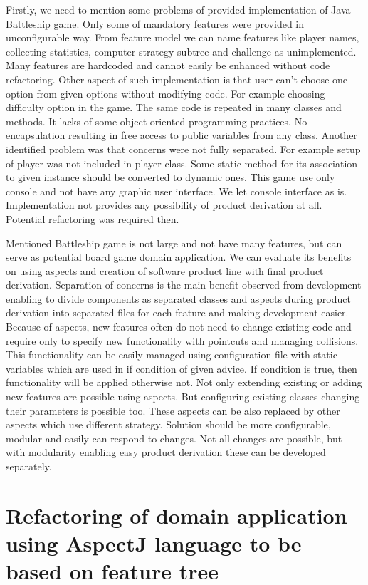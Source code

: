 \documentclass[11pt,english,a4paper,twoside]{article}
\begin{document}
Firstly, we need to mention some problems of provided implementation of Java Battleship game. Only some of mandatory features were provided in unconfigurable way. From feature model we can name features like player names, collecting statistics, computer strategy subtree and challenge as unimplemented. Many features are hardcoded and cannot easily be enhanced without code refactoring. Other aspect of such implementation is that user can't choose one option from given options without modifying code. For example choosing difficulty option in the game. The same code is repeated in many classes and methods. It lacks of some object oriented programming practices. No encapsulation resulting in free access to public variables from any class. Another identified problem was that concerns were not fully separated. For example setup of player was not included in player class. Some static method for its association to given instance should be converted to dynamic ones. This game use only console and not have any graphic user interface. We let console interface as is. Implementation not provides any possibility of product derivation at all. Potential refactoring was required then. 

Mentioned Battleship game is not large and not have many features, but can serve as potential board game domain application. We can evaluate its benefits on using aspects and creation of software product line with final product derivation. Separation of concerns is the main benefit observed from development enabling to divide components as separated classes and aspects during product derivation into separated files for each feature and making development easier. Because of aspects, new features often do not need to change existing code and require only to specify new functionality with pointcuts and managing collisions. This functionality can be easily managed using configuration file with static variables which are used in if condition of given advice. If condition is true, then functionality will be applied otherwise not. Not only extending existing or adding new features are possible using aspects. But configuring existing classes changing their parameters is possible too. These aspects can be also replaced by other aspects which use different strategy. Solution should be more configurable, modular and easily can respond to changes. Not all changes are possible, but with modularity enabling easy product derivation these can be developed separately.



\section{Refactoring of domain application using AspectJ language to be based on feature tree} \label{gameRefactoring}
\end{document}
